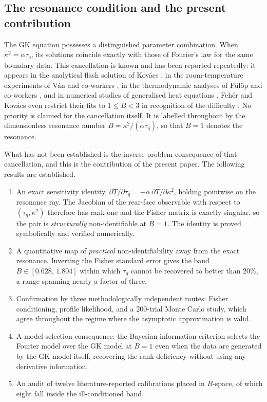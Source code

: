 \documentclass[preprint,12pt,a4paper]{elsarticle}
\theoremstyle{plain}
\theoremstyle{definition}
\theoremstyle{remark}
\newcommand{\tq}{\tau_{q}}
\newcommand{\kk}{\kappa^{2}}
\newcommand{\Bnum}{B}
\begin{document}
\subsection{The resonance condition and the present contribution}

The GK equation possesses a distinguished parameter combination. When
$\kk = \alpha\tq$, its solutions coincide exactly with those of Fourier's law
for the same boundary data. This cancellation is known and has been reported
repeatedly: it appears in the analytical flash solution of Kovács
\cite{Kovacs2018}, in the room-temperature experiments of Ván and co-workers
\cite{Van2017}, in the thermodynamic analyses of Fülöp and co-workers
\cite{FulopKovacsVan2015,Fulop2018entropy}, and in numerical studies of
generalised heat equations \cite{KovacsVan2015,Rieth2018}. Fehér and Kovács
even restrict their fits to $1 \leq \Bnum < 3$ in recognition of the difficulty
\cite{FeherKovacs2021}. No priority is claimed for the cancellation itself. It
is labelled throughout by the dimensionless resonance number
$\Bnum = \kk/(\alpha\tq)$, so that $\Bnum=1$ denotes the resonance.

What has not been established is the inverse-problem consequence of that
cancellation, and this is the contribution of the present paper. The following
results are established.

\begin{enumerate}\itemsep2pt
\item An exact sensitivity identity,
      $\partial T/\partial\tq = -\alpha\,\partial T/\partial\kk$, holding
      pointwise on the resonance ray. The Jacobian of the rear-face observable
      with respect to $(\tq,\kk)$ therefore has rank one and the Fisher matrix
      is exactly singular, so the pair is \emph{structurally} non-identifiable
      at $\Bnum=1$. The identity is proved symbolically and verified numerically.
\item A quantitative map of \emph{practical} non-identifiability away from the
      exact resonance. Inverting the Fisher standard error gives the band
      $\Bnum \in [0.628,\,1.804]$ within which $\tq$ cannot be recovered to better
      than $20\%$, a range spanning nearly a factor of three.
\item Confirmation by three methodologically independent routes: Fisher
      conditioning, profile likelihood, and a 200-trial Monte Carlo study, which
      agree throughout the regime where the asymptotic approximation is valid.
\item A model-selection consequence: the Bayesian information criterion selects
      the Fourier model over the GK model at $\Bnum=1$ even when the data are
      generated by the GK model itself, recovering the rank deficiency without
      using any derivative information.
\item An audit of twelve literature-reported calibrations placed in $\Bnum$-space,
      of which eight fall inside the ill-conditioned band.
\end{enumerate}
\end{document}

